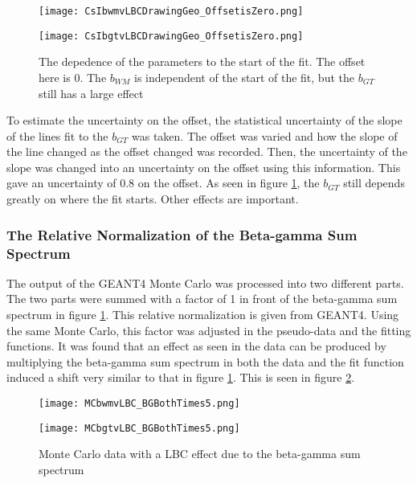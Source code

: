 \documentclass[../MaxHughesThesis.tex]{subfiles}
\begin{document}
\begin{figure}
    \centering
    \begin{minipage}{0.50\textwidth}
        \centerline{\texttt{[image: CsIbwmvLBCDrawingGeo\_OffsetisZero.png]}}
    \end{minipage}\hfill
    \begin{minipage}{0.50\textwidth}
        \centerline{\texttt{[image: CsIbgtvLBCDrawingGeo\_OffsetisZero.png]}}
    \end{minipage}
    \caption{The depedence of the parameters to the start of the fit.
	     The offset here is 0.
	     The $b_{WM}$ is independent of the start of the fit, but the $b_{GT}$ still has a large effect}
    \label{fig:offset0LBCeffect}
\end{figure}

To estimate the uncertainty on the offset, the statistical uncertainty of the slope of the lines fit to the $b_{GT}$  was taken.
The offset was varied and how the slope of the line changed as the offset changed was recorded.
Then, the uncertainty of the slope was changed into an uncertainty on the offset using this information.
This gave an uncertainty of 0.8 on the offset.
As seen in figure \ref{fig:offset0LBCeffect}, the $b_{GT}$ still depends greatly on where the fit starts.
Other effects are important. 


\subsubsection{The Relative Normalization of the Beta-gamma Sum Spectrum}

The output of the GEANT4 Monte Carlo was processed into two different parts.
The two parts were summed with a factor of 1 in front of the beta-gamma sum spectrum in figure \ref{fig:offset0LBCeffect}.
This relative normalization is given from GEANT4.
Using the same Monte Carlo, this factor was adjusted in the pseudo-data and the fitting functions.
It was found that an effect as seen in the data can be produced by multiplying the beta-gamma sum spectrum in both the data and the fit function induced a shift very similar to that in figure \ref{fig:offset0LBCeffect}.
This is seen in figure \ref{fig:MCTimes5}.    

\begin{figure}
    \centering
    \begin{minipage}{0.50\textwidth}
        \centerline{\texttt{[image: MCbwmvLBC\_BGBothTimes5.png]}}
    \end{minipage}\hfill
    \begin{minipage}{0.50\textwidth}
        \centerline{\texttt{[image: MCbgtvLBC\_BGBothTimes5.png]}}
    \end{minipage}
    \caption{Monte Carlo data with a LBC effect due to the beta-gamma sum spectrum}
    \label{fig:MCTimes5}
\end{figure}
\end{document}

